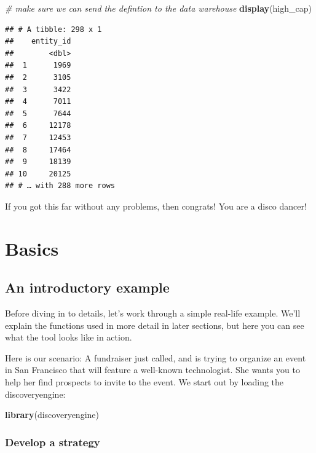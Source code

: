 \documentclass[]{book}
\newenvironment{Shaded}{\begin{snugshade}}{\end{snugshade}}
\newcommand{\CommentTok}[1]{\textcolor[rgb]{0.56,0.35,0.01}{\textit{#1}}}
\newcommand{\KeywordTok}[1]{\textcolor[rgb]{0.13,0.29,0.53}{\textbf{#1}}}
\newcommand{\NormalTok}[1]{#1}
\begin{document}
\begin{Shaded}
\begin{Highlighting}[]
\CommentTok{# make sure we can send the defintion to the data warehouse}
\KeywordTok{display}\NormalTok{(high_cap)}
\end{Highlighting}
\end{Shaded}

\begin{verbatim}
## # A tibble: 298 x 1
##    entity_id
##        <dbl>
##  1      1969
##  2      3105
##  3      3422
##  4      7011
##  5      7644
##  6     12178
##  7     12453
##  8     17464
##  9     18139
## 10     20125
## # … with 288 more rows
\end{verbatim}

If you got this far without any problems, then congrats! You are a disco dancer!

\hypertarget{part-basics}{%
\part{Basics}\label{part-basics}}

\hypertarget{intro-example}{%
\chapter{An introductory example}\label{intro-example}}

Before diving in to details, let's work through a simple real-life example. We'll explain the functions used in more detail in later sections, but here you can see what the tool looks like in action.

Here is our scenario: A fundraiser just called, and is trying to organize an event in San Francisco that will feature a well-known technologist. She wants you to help her find prospects to invite to the event. We start out by loading the discoveryengine:

\begin{Shaded}
\begin{Highlighting}[]
\KeywordTok{library}\NormalTok{(discoveryengine)}
\end{Highlighting}
\end{Shaded}

\hypertarget{develop-a-strategy}{%
\section{Develop a strategy}\label{develop-a-strategy}}
\end{document}

